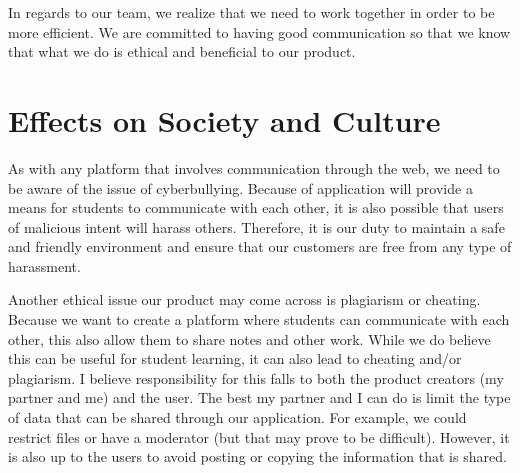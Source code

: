In regards to our team, we realize that we need to work together in order to be more efficient. We are committed to having good communication so that we know that what we do is ethical and beneficial to our product.

\section{Effects on Society and Culture}
As with any platform that involves communication through the web, we need to be aware of the issue of cyberbullying. Because of application will provide a means for students to communicate with each other, it is also possible that users of malicious intent will harass others. Therefore, it is our duty to maintain a safe and friendly environment and ensure that our customers are free from any type of harassment.

Another ethical issue our product may come across is plagiarism or cheating. Because we want to create a platform where students can communicate with each other, this also allow them to share notes and other work. While we do believe this can be useful for student learning, it can also lead to cheating and/or plagiarism. I believe responsibility for this falls to both the product creators (my partner and me) and the user. The best my partner and I can do is limit the type of data that can be shared through our application. For example, we could restrict files or have a moderator (but that may prove to be difficult). However, it is also up to the users to avoid posting or copying the information that is shared.